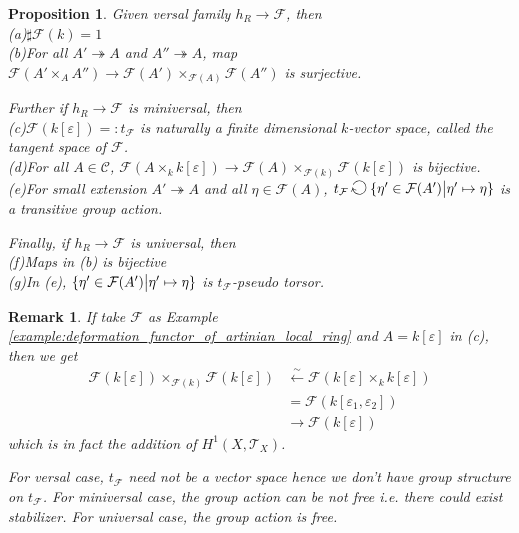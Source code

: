 \documentclass{ctexart}
\newtheorem{remark}{Remark}[section]
\newtheorem{proposition}{Proposition}[section]
\newcommand{\groupaction}{\mathrel{\text{\scalebox{1.5}{\rotatebox[origin=c]{90}{$\circlearrowright$}}}}}
\begin{document}
\begin{proposition}
    Given versal family $h_{R} \rightarrow \mathcal{F}$, then \\
    (a)$\sharp \mathcal{F}(k) = 1$ \\
    (b)For all $A' \twoheadrightarrow A$ and $A'' \twoheadrightarrow A$,
    map $\mathcal{F}(A' \times_{A} A'') \rightarrow \mathcal{F}(A') \times_{\mathcal{F}(A)} \mathcal{F}(A'')$ is surjective.
    \par
    Further if $h_{R} \rightarrow \mathcal{F}$ is miniversal, then \\
    (c)$\mathcal{F}(k[\varepsilon]) =: t_{\mathcal{F}}$ is naturally a finite dimensional $k$-vector space, called the tangent space of $\mathcal{F}$. \\
    (d)For all $A\in \mathcal{C}$, $\mathcal{F}(A \times_{k} k[\varepsilon]) \rightarrow \mathcal{F}(A) \times_{\mathcal{F}(k)} \mathcal{F}(k[\varepsilon])$ is bijective. \\
    (e)For small extension $A' \twoheadrightarrow A$ and all $\eta\in \mathcal{F}(A)$,
    $t_{\mathcal{F}} \groupaction \{\eta'\in \mathcal{F}(A') \big{|} \eta' \mapsto \eta\}$ is a transitive group action. 
    \par
    Finally, if $h_{R} \rightarrow \mathcal{F}$ is universal, then \\
    (f)Maps in (b) is bijective \\
    (g)In (e), $\{\eta'\in \mathcal{F}(A') \big{|} \eta' \mapsto \eta\}$ is $t_{\mathcal{F}}$-pseudo torsor.
    \label{Proposition 4.1}
\end{proposition}
\begin{remark}
    If take $\mathcal{F}$ as Example \ref{example:deformation_functor_of_artinian_local_ring} and $A = k[\varepsilon]$ in (c), then we get 
    \begin{equation}
        \begin{split}
            \mathcal{F}(k[\varepsilon]) \times_{\mathcal{F}(k)} \mathcal{F}(k[\varepsilon]) & \overset{\sim}{\longleftarrow} \mathcal{F}(k[\varepsilon] \times_{k} k[\varepsilon]) \\
            & = \mathcal{F}(k[\varepsilon_{1}, \varepsilon_{2}]) \\
            & \longrightarrow \mathcal{F}(k[\varepsilon])
        \end{split}
    \end{equation}
    which is in fact the addition of $H^{1}(X, \mathcal{T}_{X})$.
    \par
    For versal case, $t_{\mathcal{F}}$ need not be a vector space hence we don't have group structure on $t_{\mathcal{F}}$.
    For miniversal case, the group action can be not free i.e. there could exist stabilizer.
    For universal case, the group action is free.
\end{remark}
\end{document}
